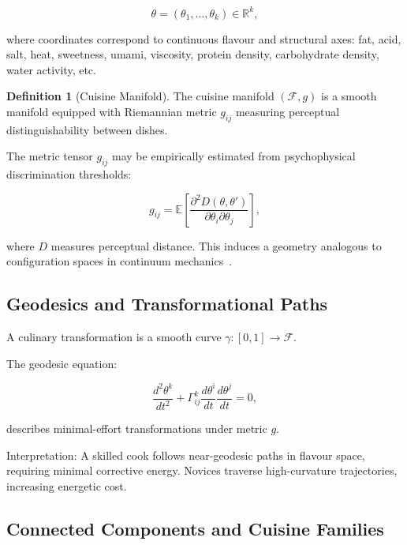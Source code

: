 \documentclass[12pt,a4paper]{article}
\theoremstyle{definition}
\newtheorem{definition}{Definition}[section]
\begin{document}
\begin{equation}
  \theta = (\theta_1,\dots,\theta_k) \in \mathbb{R}^k,
\end{equation}

where coordinates correspond to continuous flavour and structural axes:
fat, acid, salt, heat, sweetness, umami, viscosity, protein density,
carbohydrate density, water activity, etc.

\begin{definition}[Cuisine Manifold]
  The cuisine manifold $(\mathcal{F}, g)$ is a smooth manifold
  equipped with Riemannian metric $g_{ij}$ measuring perceptual
  distinguishability between dishes.
\end{definition}

The metric tensor $g_{ij}$ may be empirically estimated from
psychophysical discrimination thresholds:

\begin{equation}
  g_{ij} = \mathbb{E}
  \left[
  \frac{\partial^2 D(\theta,\theta')}
       {\partial \theta_i \partial \theta_j}
  \right],
\end{equation}

where $D$ measures perceptual distance.
This induces a geometry analogous to configuration spaces
in continuum mechanics~\citep{evans2010}.

\subsection{Geodesics and Transformational Paths}

A culinary transformation is a smooth curve
$\gamma : [0,1] \to \mathcal{F}$.

The geodesic equation:

\begin{equation}
  \frac{d^2 \theta^k}{dt^2}
  + \Gamma^k_{ij}
  \frac{d \theta^i}{dt}
  \frac{d \theta^j}{dt}
  = 0,
\end{equation}

describes minimal-effort transformations under metric $g$.

Interpretation:
A skilled cook follows near-geodesic paths in flavour space,
requiring minimal corrective energy.
Novices traverse high-curvature trajectories,
increasing energetic cost.

\subsection{Connected Components and Cuisine Families}
\end{document}
